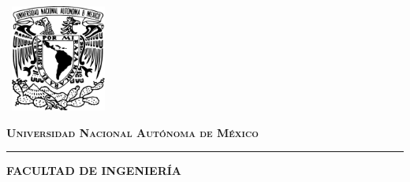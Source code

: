 \documentclass[letterpaper,12pt,oneside]{book}
\begin{document}
    \begin{titlepage}
        \thispagestyle{empty}
        \begin{minipage}[c][0.17\textheight][c]{0.25\textwidth}
            \begin{center}
                \includegraphics[width=3.5cm, height=3.5cm]{Escudo-UNAM.pdf}
            \end{center}
        \end{minipage}
        \begin{minipage}[c][0.195\textheight][t]{0.75\textwidth}
            \begin{center}
                \textsc{\large \textbf{Universidad Nacional Aut\'onoma de M\'exico}}\\[0.5cm]
                \vspace{0.2cm}
                \hrule height1pt
                \vspace{0.5cm}
                \textsc{\textbf{FACULTAD DE INGENIERÍA}}
            \end{center}
        \end{minipage}


\end{titlepage}
\end{document}
